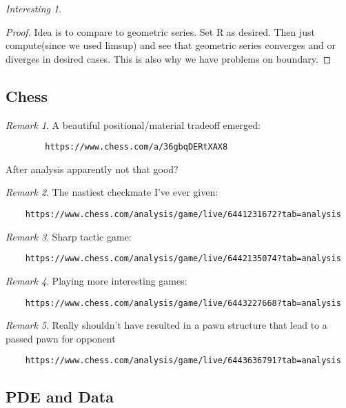 \documentclass[11pt]{article}
\theoremstyle{remark}
\newtheorem{remark}{Remark}
\newtheorem{interest}{Interesting}
\begin{document}
\begin{interest}
\begin{proof}
	Idea is to compare to geometric series. Set R as desired. Then just compute(since we used limsup) and see that geometric series converges and or diverges in desired cases. This is also why we have problems on boundary. 
\end{proof}

\subsection{Chess}

\begin{remark}
	A beautiful positional/material tradeoff emerged:
	\begin{verbatim}
		https://www.chess.com/a/36gbqDERtXAX8
	\end{verbatim}

	After analysis apparently not that good?
\end{remark}

\begin{remark}
	The nastiest checkmate I've ever given:
	\begin{verbatim}
	https://www.chess.com/analysis/game/live/6441231672?tab=analysis
	\end{verbatim}
\end{remark}

\begin{remark}
	Sharp tactic game:
	\begin{verbatim}
	https://www.chess.com/analysis/game/live/6442135074?tab=analysis
	\end{verbatim}
\end{remark}

\begin{remark}
	Playing more interesting games:
	\begin{verbatim}
	https://www.chess.com/analysis/game/live/6443227668?tab=analysis
	\end{verbatim}
\end{remark}

\begin{remark}
	Really shouldn't have resulted in a pawn structure that lead to a passed pawn for opponent
	\begin{verbatim}
	https://www.chess.com/analysis/game/live/6443636791?tab=analysis
	\end{verbatim}
\end{remark}



\subsection{PDE and Data}


\end{interest}
\end{document}
